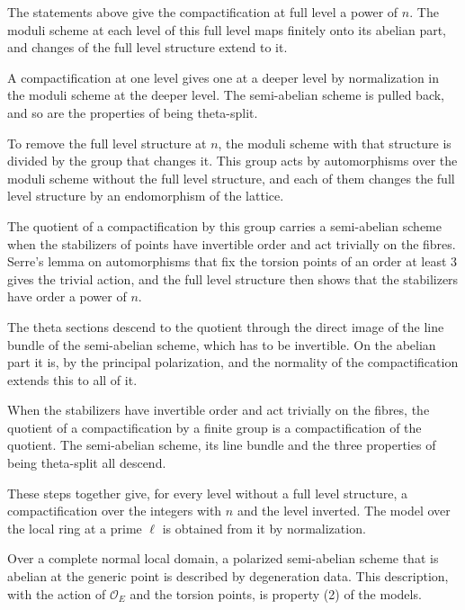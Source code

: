 The statements above give the compactification at full level a power of $n$. The moduli scheme at each
level of this full level maps finitely onto its abelian part, and changes of the full level structure
extend to it.

A compactification at one level gives one at a deeper level by normalization in the moduli scheme at
the deeper level. The semi-abelian scheme is pulled back, and so are the properties of being
theta-split.

To remove the full level structure at $n$, the moduli scheme with that structure is divided by the
group that changes it. This group acts by automorphisms over the moduli scheme without the full level
structure, and each of them changes the full level structure by an endomorphism of the lattice.

The quotient of a compactification by this group carries a semi-abelian scheme when the stabilizers of
points have invertible order and act trivially on the fibres. Serre's lemma on automorphisms that fix
the torsion points of an order at least $3$ gives the trivial action, and the full level structure then
shows that the stabilizers have order a power of $n$.

The theta sections descend to the quotient through the direct image of the line bundle of the
semi-abelian scheme, which has to be invertible. On the abelian part it is, by the principal
polarization, and the normality of the compactification extends this to all of it.

When the stabilizers have invertible order and act trivially on the fibres, the quotient of a
compactification by a finite group is a compactification of the quotient. The semi-abelian scheme,
its line bundle and the three properties of being theta-split all descend.

These steps together give, for every level without a full level structure, a compactification over
the integers with $n$ and the level inverted. The model over the local ring at a prime $\ell$ is
obtained from it by normalization.

Over a complete normal local domain, a polarized semi-abelian scheme that is abelian at the generic
point is described by degeneration data. This description, with the action of $\mathcal O_E$ and the
torsion points, is property (2) of the models.

